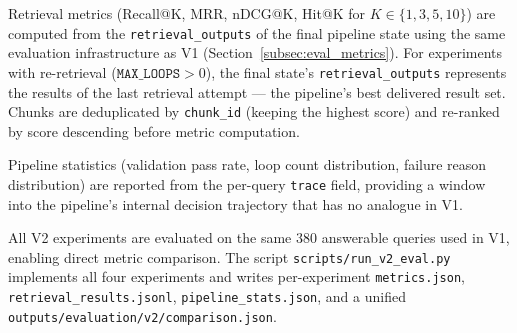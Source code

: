 Retrieval metrics (Recall@K, MRR, nDCG@K, Hit@K for $K \in \{1,3,5,10\}$)
are computed from the \texttt{retrieval\_outputs} of the final pipeline state
using the same evaluation infrastructure as V1 (Section~\ref{subsec:eval_metrics}).
For experiments with re-retrieval ($\texttt{MAX\_LOOPS} > 0$), the final
state's \texttt{retrieval\_outputs} represents the results of the last
retrieval attempt --- the pipeline's best delivered result set.
Chunks are deduplicated by \texttt{chunk\_id} (keeping the highest score)
and re-ranked by score descending before metric computation.

Pipeline statistics (validation pass rate, loop count distribution, failure
reason distribution) are reported from the per-query \texttt{trace} field,
providing a window into the pipeline's internal decision trajectory that has
no analogue in V1.

All V2 experiments are evaluated on the same 380 answerable queries used in
V1, enabling direct metric comparison. The script
\texttt{scripts/run\_v2\_eval.py} implements all four experiments and writes
per-experiment \texttt{metrics.json}, \texttt{retrieval\_results.jsonl},
\texttt{pipeline\_stats.json}, and a unified \texttt{outputs/evaluation/v2/comparison.json}.
